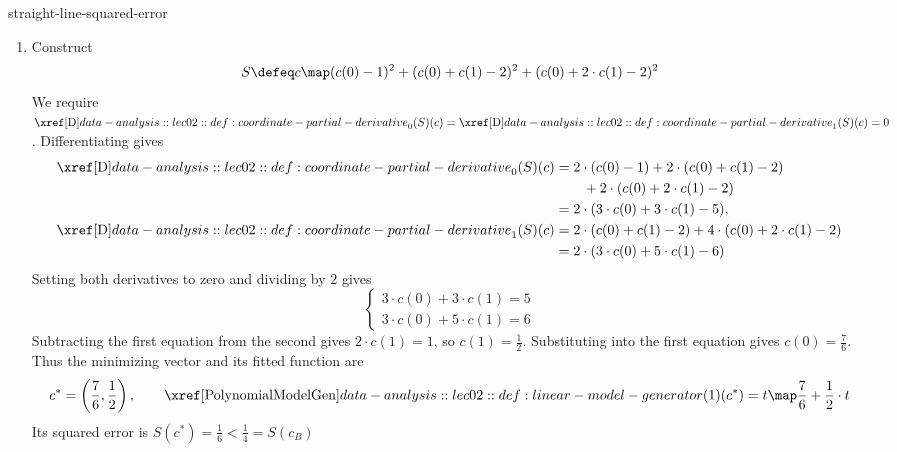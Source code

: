 \documentclass[12pt]{article}
\begin{document}
\begin{eg}{straight-line-squared-error}
\begin{enumerate}
      Since $S(c_B)=\frac14<1=S(c_A)$, candidate $B$ has the smaller
      sum of squared errors
      \item Construct
        \[
          S\defeq c\map
            (c(0)-1)^2+(c(0)+c(1)-2)^2+(c(0)+2\cdot c(1)-2)^2
        \]
        We require $\PartialD_0(S)(c)=\PartialD_1(S)(c)=0$.
        Differentiating gives
        \begin{align*}
          \PartialD_0(S)(c)
            &=2\cdot(c(0)-1)+2\cdot(c(0)+c(1)-2)\\
            &\qquad+2\cdot(c(0)+2\cdot c(1)-2)\\
            &=2\cdot(3\cdot c(0)+3\cdot c(1)-5),\\
          \PartialD_1(S)(c)
            &=2\cdot(c(0)+c(1)-2)+4\cdot(c(0)+2\cdot c(1)-2)\\
            &=2\cdot(3\cdot c(0)+5\cdot c(1)-6)
        \end{align*}
        Setting both derivatives to zero and dividing by $2$ gives
        \[
          \begin{cases}
            3\cdot c(0)+3\cdot c(1)=5\\
            3\cdot c(0)+5\cdot c(1)=6
          \end{cases}
        \]
        Subtracting the first equation from the second gives
        $2\cdot c(1)=1$, so $c(1)=\frac12$.
        Substituting into the first equation gives $c(0)=\frac76$.
        Thus the minimizing vector and its fitted function are
        \[
          c^*=\left(\frac76,\frac12\right),\qquad
          \PolynomialModelGen(1)(c^*)=t\map\frac76+\frac12\cdot t
        \]
        Its squared error is $S(c^*)=\frac16<\frac14=S(c_B)$
    \end{enumerate}
\end{eg}
\end{document}
